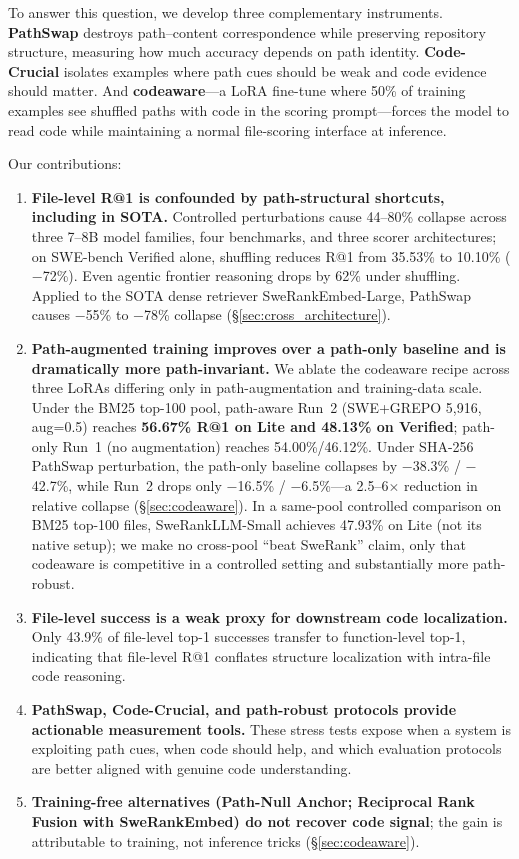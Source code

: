 \documentclass{article}
\begin{document}
To answer this question, we develop three complementary instruments.
\textbf{PathSwap} destroys path--content correspondence while preserving repository structure, measuring how much accuracy depends on path identity.
\textbf{Code-Crucial} isolates examples where path cues should be weak and code evidence should matter.
And \textbf{codeaware}---a LoRA fine-tune where 50\% of training examples see shuffled paths with code in the scoring prompt---forces the model to read code while maintaining a normal file-scoring interface at inference.

Our contributions:
\begin{enumerate}
    \item \textbf{File-level R@1 is confounded by path-structural shortcuts, including in SOTA.}
    Controlled perturbations cause 44--80\% collapse across three 7--8B model families, four benchmarks, and three scorer architectures; on SWE-bench Verified alone, shuffling reduces R@1 from 35.53\% to 10.10\% ($-$72\%). Even agentic frontier reasoning drops by 62\% under shuffling. Applied to the SOTA dense retriever SweRankEmbed-Large, PathSwap causes $-$55\% to $-$78\% collapse (\S\ref{sec:cross_architecture}).

    \item \textbf{Path-augmented training improves over a path-only baseline and is dramatically more path-invariant.}
    We ablate the codeaware recipe across three LoRAs differing only in path-augmentation and training-data scale.
    Under the BM25 top-100 pool, path-aware Run~2 (SWE+GREPO 5{,}916, aug=0.5) reaches \textbf{56.67\% R@1 on Lite and 48.13\% on Verified}; path-only Run~1 (no augmentation) reaches 54.00\%/46.12\%.
    Under SHA-256 PathSwap perturbation, the path-only baseline collapses by $-$38.3\% / $-$42.7\%, while Run~2 drops only $-$16.5\% / $-$6.5\%---a 2.5--6$\times$ reduction in relative collapse (\S\ref{sec:codeaware}).
    In a same-pool controlled comparison on BM25 top-100 files, SweRankLLM-Small achieves 47.93\% on Lite (not its native setup); we make no cross-pool ``beat SweRank'' claim, only that codeaware is competitive in a controlled setting and substantially more path-robust.

    \item \textbf{File-level success is a weak proxy for downstream code localization.}
    Only 43.9\% of file-level top-1 successes transfer to function-level top-1, indicating that file-level R@1 conflates structure localization with intra-file code reasoning.

    \item \textbf{PathSwap, Code-Crucial, and path-robust protocols provide actionable measurement tools.}
    These stress tests expose when a system is exploiting path cues, when code should help, and which evaluation protocols are better aligned with genuine code understanding.

    \item \textbf{Training-free alternatives (Path-Null Anchor; Reciprocal Rank Fusion with SweRankEmbed) do not recover code signal}; the gain is attributable to training, not inference tricks (\S\ref{sec:codeaware}).
\end{enumerate}
\end{document}
